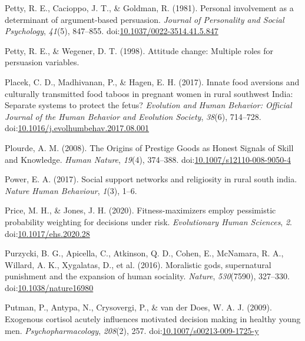 \documentclass[
  11pt,
]{article}
\begin{document}
\leavevmode\hypertarget{ref-pettyPersonalInvolvementDeterminant1981}{}%
Petty, R. E., Cacioppo, J. T., \& Goldman, R. (1981). Personal
involvement as a determinant of argument-based persuasion. \emph{Journal
of Personality and Social Psychology}, \emph{41}(5), 847--855.
doi:\href{https://doi.org/10.1037/0022-3514.41.5.847}{10.1037/0022-3514.41.5.847}

\leavevmode\hypertarget{ref-petty1998attitude}{}%
Petty, R. E., \& Wegener, D. T. (1998). Attitude change: Multiple roles
for persuasion variables.

\leavevmode\hypertarget{ref-placekInnateFoodAversions2017}{}%
Placek, C. D., Madhivanan, P., \& Hagen, E. H. (2017). Innate food
aversions and culturally transmitted food taboos in pregnant women in
rural southwest India: Separate systems to protect the fetus?
\emph{Evolution and Human Behavior: Official Journal of the Human
Behavior and Evolution Society}, \emph{38}(6), 714--728.
doi:\href{https://doi.org/10.1016/j.evolhumbehav.2017.08.001}{10.1016/j.evolhumbehav.2017.08.001}

\leavevmode\hypertarget{ref-plourdeOriginsPrestigeGoods2008}{}%
Plourde, A. M. (2008). The Origins of Prestige Goods as Honest Signals
of Skill and Knowledge. \emph{Human Nature}, \emph{19}(4), 374--388.
doi:\href{https://doi.org/10.1007/s12110-008-9050-4}{10.1007/s12110-008-9050-4}

\leavevmode\hypertarget{ref-power2017social}{}%
Power, E. A. (2017). Social support networks and religiosity in rural
south india. \emph{Nature Human Behaviour}, \emph{1}(3), 1--6.

\leavevmode\hypertarget{ref-priceFitnessmaximizersEmployPessimistic2020}{}%
Price, M. H., \& Jones, J. H. (2020). Fitness-maximizers employ
pessimistic probability weighting for decisions under risk.
\emph{Evolutionary Human Sciences}, \emph{2}.
doi:\href{https://doi.org/10.1017/ehs.2020.28}{10.1017/ehs.2020.28}

\leavevmode\hypertarget{ref-purzyckiMoralisticGodsSupernatural2016}{}%
Purzycki, B. G., Apicella, C., Atkinson, Q. D., Cohen, E., McNamara, R.
A., Willard, A. K., Xygalatas, D., et al. (2016). Moralistic gods,
supernatural punishment and the expansion of human sociality.
\emph{Nature}, \emph{530}(7590), 327--330.
doi:\href{https://doi.org/10.1038/nature16980}{10.1038/nature16980}

\leavevmode\hypertarget{ref-putmanExogenousCortisolAcutely2009}{}%
Putman, P., Antypa, N., Crysovergi, P., \& van der Does, W. A. J.
(2009). Exogenous cortisol acutely influences motivated decision making
in healthy young men. \emph{Psychopharmacology}, \emph{208}(2), 257.
doi:\href{https://doi.org/10.1007/s00213-009-1725-y}{10.1007/s00213-009-1725-y}
\end{document}
